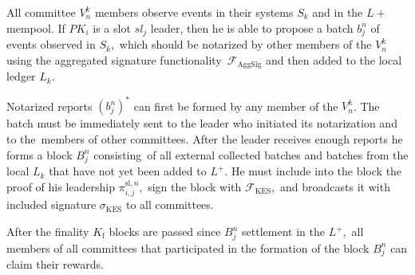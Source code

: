 \begin{legal}
    \item All committee $V^k_n$ members observe events in their systems $S_k$ and in the $L+$ mempool.
    If $PK_i$ is a slot $sl_j$ leader, then he is able to propose a batch $b^n_j$ of events observed in $S_k$,\
    which should be notarized by other members of the $V^k_n$ using the aggregated signature functionality\
    ${\mathcal{F}}_{\text{AggSig}}$ and then added to the local ledger $L_k$.

    \item Notarized reports $(b^n_j)^*$ can first be formed by any member of the $V^k_n$.
    The batch must be immediately sent to the leader who initiated its notarization and to the\
    members of other committees.
    After the leader receives enough reports he forms a block  $B^n_j$ consisting\
    of all external collected batches and batches from the local $L_k$ that have not yet been added to $L^+$.
    He must include into the block the proof of his leadership $ \pi_{i, j}^{\text{sl}, n}$,\
    sign the block with ${\mathcal{F}}_{\text{KES}}$,\
    and broadcasts it with included signature $\sigma_{\text{KES}}$ to all committees.

    \item After the finality $K_{\text{f}}$ blocks are passed since $B^n_j$ settlement in the $L^+$,\
    all members of all committees that participated in the formation of the block $B^n_j$ can claim their rewards.

\end{legal}


